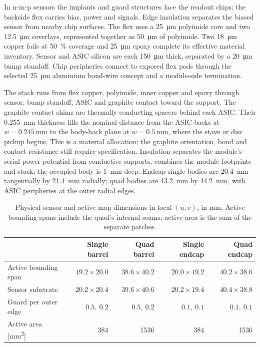 In n-in-p sensors the implants and guard structures face the readout chips;
the backside flex carries bias, power and signals. Edge insulation separates
the biased sensor from nearby chip surfaces.\cite{slim} The flex uses a
\qty{25}{\micro\metre} polyimide core and two
\qty{12.5}{\micro\metre} coverlays, represented together as
\qty{50}{\micro\metre} of polyimide. Two \qty{18}{\micro\metre} copper foils
at \qty{50}{\percent} coverage and \qty{25}{\micro\metre} epoxy complete
its effective material inventory. Sensor and ASIC silicon are each
\qty{150}{\micro\metre} thick, separated by a
\qty{20}{\micro\metre} bump standoff. Chip peripheries connect to exposed
flex pads through the selected \qty{25}{\micro\metre} aluminium bond-wire
concept and a module-side termination.

The stack runs from flex copper, polyimide, inner copper and epoxy through
sensor, bump standoff, ASIC and graphite contact toward the support.
The graphite contact shims are thermally conducting spacers behind each ASIC.
Their \qty{0.255}{\milli\metre} thickness fills the nominal distance from the ASIC backs at
$w=\qty{0.245}{\milli\metre}$ to the body-back plane at
$w=\qty{0.5}{\milli\metre}$, where the stave or disc pickup begins.
This is a material allocation; the graphite orientation, bond and contact
resistance still require specification. Insulation separates the module's serial-power
potential from conductive supports.  combines the
module footprints and stack; the occupied body is \qty{1}{\milli\metre} deep.
Endcap single bodies are \qty{20.4}{\milli\metre} tangentially by
\qty{21.4}{\milli\metre} radially; quad bodies are
\qty{43.2}{\milli\metre} by \qty{44.2}{\milli\metre}, with ASIC peripheries
at the outer radial edges.

\begin{table}[!htbp]
\caption{Physical sensor and active-map dimensions in local $(u,v)$, in
\unit{\milli\metre}. Active bounding spans include the quad's internal seams;
active area is the sum of the separate patches.}
\label{tab:pixel-sensor-dimensions}
\centering\small
\begingroup\setlength{\tabcolsep}{3pt}
\begin{tabular}{@{}lrrrr@{}}
\toprule & Single barrel & Quad barrel & Single endcap & Quad endcap\\\midrule
Active bounding span & $19.2\times20.0$ & $38.6\times40.2$ & $20.0\times19.2$ & $40.2\times38.6$\\
Sensor substrate & $20.2\times20.4$ & $39.6\times40.6$ & $20.2\times19.4$ & $40.4\times38.8$\\
Guard per outer edge & $0.5,\ 0.2$ & $0.5,\ 0.2$ & $0.1,\ 0.1$ & $0.1,\ 0.1$\\
Active area [\unit{\milli\metre\squared}] & 384 & 1536 & 384 & 1536\\\bottomrule
\end{tabular}
\endgroup
\end{table}

